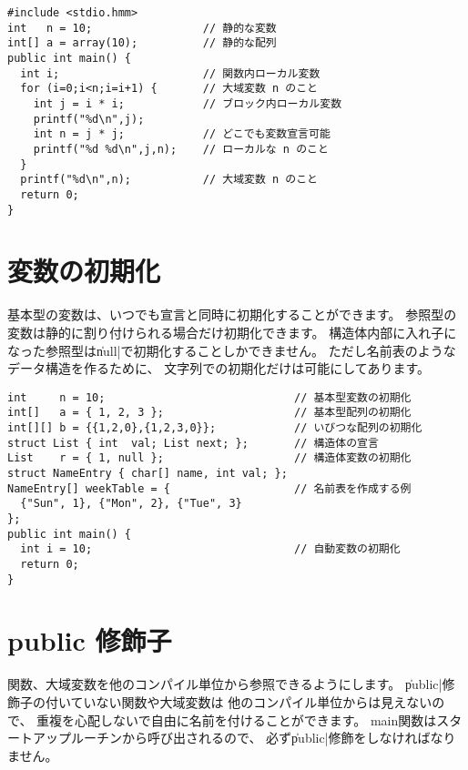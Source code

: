 \begin{mylist}
\begin{verbatim}
#include <stdio.hmm>
int   n = 10;                 // 静的な変数
int[] a = array(10);          // 静的な配列
public int main() {
  int i;                      // 関数内ローカル変数
  for (i=0;i<n;i=i+1) {       // 大域変数 n のこと
    int j = i * i;            // ブロック内ローカル変数
    printf("%d\n",j);
    int n = j * j;            // どこでも変数宣言可能
    printf("%d %d\n",j,n);    // ローカルな n のこと
  }                        
  printf("%d\n",n);           // 大域変数 n のこと
  return 0;
}
\end{verbatim}
\end{mylist}

\section{変数の初期化}

基本型の変数は、いつでも宣言と同時に初期化することができます。
参照型の変数は静的に割り付けられる場合だけ初期化できます。
構造体内部に入れ子になった参照型は\|null|で初期化することしかできません。
ただし名前表のようなデータ構造を作るために、
文字列での初期化だけは可能にしてあります。

\begin{mylist}
\begin{verbatim}
int     n = 10;                             // 基本型変数の初期化
int[]   a = { 1, 2, 3 };                    // 基本型配列の初期化
int[][] b = {{1,2,0},{1,2,3,0}};            // いびつな配列の初期化
struct List { int  val; List next; };       // 構造体の宣言
List    r = { 1, null };                    // 構造体変数の初期化
struct NameEntry { char[] name, int val; };
NameEntry[] weekTable = {                   // 名前表を作成する例
  {"Sun", 1}, {"Mon", 2}, {"Tue", 3}
};
public int main() {
  int i = 10;                               // 自動変数の初期化
  return 0;
}
\end{verbatim}
\end{mylist}

\section{public 修飾子}

関数、大域変数を他のコンパイル単位から参照できるようにします。
\|public|修飾子の付いていない関数や大域変数は
他のコンパイル単位からは見えないので、
重複を心配しないで自由に名前を付けることができます。
main関数はスタートアップルーチンから呼び出されるので、
必ず\|public|修飾をしなければなりません。


